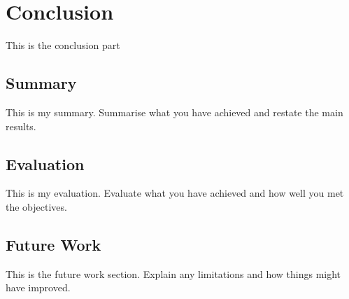 \chapter{Conclusion}

This is the conclusion part

\section{Summary}
This is my summary.
Summarise what you have achieved and restate the main results.

\section{Evaluation}
This is my evaluation.
Evaluate what you have achieved and how well you met the objectives.

\section{Future Work}
This is the future work section.
Explain any limitations and how things might have improved.